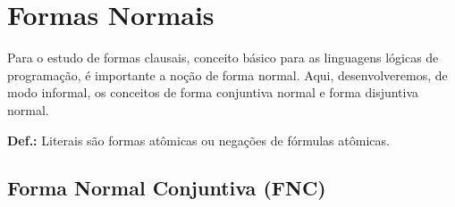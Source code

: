 \newpage

\section{Formas Normais}
Para o estudo de formas clausais, conceito básico para as linguagens lógicas de programação, é importante a noção de forma normal. Aqui, desenvolveremos, de modo informal, os conceitos de forma conjuntiva normal e forma disjuntiva normal.

\bigskip
\noindent
\textbf{Def.:}  Literais são formas atômicas ou negações de fórmulas atômicas.

\subsection{Forma Normal Conjuntiva (FNC)}
